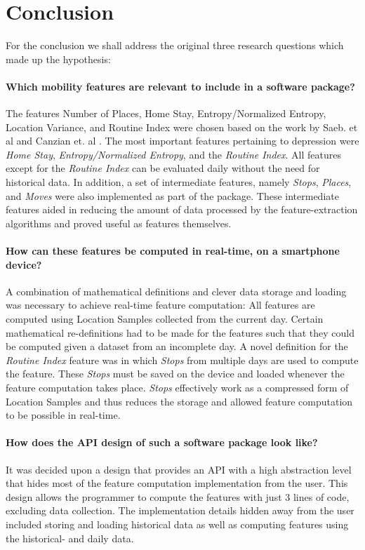 \chapter{Conclusion}
\label{chapter:08}

For the conclusion we shall address the original three research questions which made up the hypothesis:

\subsubsection*{Which mobility features are relevant to include in a software package?}
The features Number of Places, Home Stay, Entropy/Normalized Entropy, Location Variance, and Routine Index were chosen based on the work by Saeb. et al \cite{Saeb2015} and Canzian et. al \cite{Canzian2015}. The most important features pertaining to depression were \textit{Home Stay}, \textit{Entropy/Normalized Entropy}, and the \textit{Routine Index}. All features except for the \textit{Routine Index} can be evaluated daily without the need for historical data. In addition, a set of intermediate features, namely \textit{Stops}, \textit{Places}, and \textit{Moves} were also implemented as part of the package. These intermediate features aided in reducing the amount of data processed by the feature-extraction algorithms and proved useful as features themselves.

\subsubsection*{How can these features be computed in real-time, on a smartphone device?}
A combination of mathematical definitions and clever data storage and loading was necessary to achieve real-time feature computation: All features are computed using Location Samples collected from the current day. Certain mathematical re-definitions had to be made for the features such that they could be computed given a dataset from an incomplete day. A novel definition for the \textit{Routine Index} feature was in which \textit{Stops} from multiple days are used to compute the feature. These \textit{Stops} must be saved on the device and loaded whenever the feature computation takes place. \textit{Stops} effectively work as a compressed form of Location Samples and thus reduces the storage and allowed feature computation to be possible in real-time.

\subsubsection*{How does the API design of such a software package look like?}
It was decided upon a design that provides an API with a high abstraction level that hides most of the feature computation implementation from the user. This design allows the programmer to compute the features with just 3 lines of code, excluding data collection. The implementation details hidden away from the user included storing and loading historical data as well as computing features using the historical- and daily data. 


